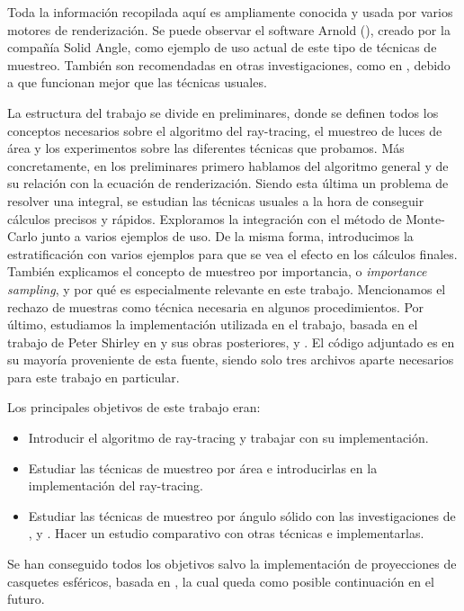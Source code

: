\documentclass{scrbook}
\begin{document}
Toda la información recopilada aquí es ampliamente conocida y usada por varios motores de renderización. Se puede observar el software Arnold (\cite{arnold}), creado por la compañía Solid Angle, como ejemplo de uso actual de este tipo de técnicas de muestreo. También son recomendadas en otras investigaciones, como en 
\cite{productionVolume}, debido a que funcionan mejor que las técnicas usuales.

La estructura del trabajo se divide en preliminares, donde se definen todos los conceptos necesarios sobre el algoritmo del ray-tracing, el muestreo de luces de área y los experimentos sobre las diferentes técnicas que probamos. Más concretamente, en los preliminares primero hablamos del algoritmo general y de su relación con la ecuación de renderización. Siendo esta última un problema de resolver una integral, se estudian las técnicas usuales a la hora de conseguir cálculos precisos y rápidos. Exploramos la integración con el método de Monte-Carlo junto a varios ejemplos de uso. De la misma forma, introducimos la estratificación con varios ejemplos para que se vea el efecto en los cálculos finales. También explicamos el concepto de muestreo por importancia, o \textit{importance sampling}, y por qué es especialmente relevante en este trabajo. Mencionamos el rechazo de muestras como técnica necesaria en algunos procedimientos. Por último, estudiamos la implementación utilizada en el trabajo, basada en el trabajo de Peter Shirley en \cite{Weekend} y sus obras posteriores, \cite{NextWeek} y \cite{RestOfYourLife}. El código adjuntado es en su mayoría proveniente de esta fuente, siendo solo tres archivos aparte necesarios para este trabajo en particular. 

Los principales objetivos de este trabajo eran:
\begin{itemize}
	\item Introducir el algoritmo de ray-tracing y trabajar con su implementación.
	\item Estudiar las técnicas de muestreo por área e introducirlas en la implementación del ray-tracing.
	\item Estudiar las técnicas de muestreo por ángulo sólido con las investigaciones de \cite{ur2013}, \cite{ur2017} y \cite{ur2018}. Hacer un estudio comparativo con otras técnicas e implementarlas.
\end{itemize}

Se han conseguido todos los objetivos salvo la implementación de proyecciones de casquetes esféricos, basada en \cite{ur2018}, la cual queda como posible continuación en el futuro.
\end{document}
